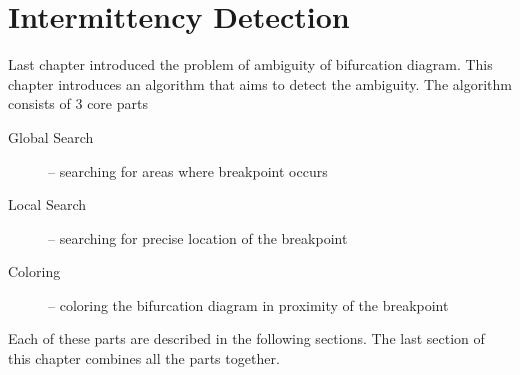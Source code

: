 \chapter{Intermittency Detection}
Last chapter introduced the problem of ambiguity of bifurcation diagram.
This chapter introduces an algorithm that aims to detect the ambiguity.
The algorithm consists of 3 core parts

\begin{description}
	\item [Global Search] -- searching for areas where breakpoint occurs
	\item [Local Search] -- searching for precise location of the breakpoint
	\item [Coloring] -- coloring the bifurcation diagram in proximity of the breakpoint
\end{description}

Each of these parts are described in the following sections.
The last section of this chapter combines all the parts together.

